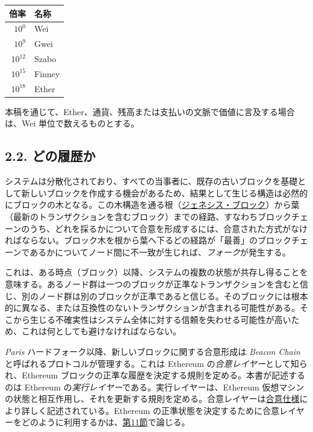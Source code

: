\documentclass[
]{ltjsarticle}
\begin{document}
\begin{longtable}[]{@{}rl@{}}
\toprule\noalign{}
倍率 & 名称 \\
\midrule\noalign{}
\endhead
\bottomrule\noalign{}
\endlastfoot
\(10^0\) & Wei \\
\(10^9\) & Gwei \\
\(10^{12}\) & Szabo \\
\(10^{15}\) & Finney \\
\(10^{18}\) & Ether \\
\end{longtable}

本稿を通じて、Ether、通貨、残高または支払いの文脈で価値に言及する場合は、Wei
単位で数えるものとする。

\hypertarget{ux3069ux306eux5c65ux6b74ux304b}{%
\subsection{2.2. どの履歴か}\label{ux3069ux306eux5c65ux6b74ux304b}}

システムは分散化されており、すべての当事者に、既存の古いブロックを基礎として新しいブロックを作成する機会があるため、結果として生じる構造は必然的にブロックの木となる。この木構造を通る根（\protect\hyperlink{Genesis_Block}{ジェネシス・ブロック}）から葉（最新のトランザクションを含むブロック）までの経路、すなわちブロックチェーンのうち、どれを採るかについて合意を形成するには、合意された方式がなければならない。ブロック木を根から葉へ下るどの経路が「最善」のブロックチェーンであるかについてノード間に不一致が生じれば、\emph{フォーク}が発生する。

これは、ある時点（ブロック）以降、システムの複数の状態が共存し得ることを意味する。あるノード群は一つのブロックが正準なトランザクションを含むと信じ、別のノード群は別のブロックが正準であると信じる。そのブロックには根本的に異なる、または互換性のないトランザクションが含まれる可能性がある。そこから生じる不確実性はシステム全体に対する信頼を失わせる可能性が高いため、これは何としても避けなければならない。

\emph{Paris} ハードフォーク以降、新しいブロックに関する合意形成は
\emph{Beacon Chain} と呼ばれるプロトコルが管理する。これは Ethereum
の\emph{合意レイヤー}として知られ、Ethereum
ブロックの正準な履歴を決定する規則を定める。本書が記述するのは Ethereum
の\emph{実行レイヤー}である。実行レイヤーは、Ethereum
仮想マシンの状態と相互作用し、それを更新する規則を定める。合意レイヤーは\href{https://github.com/ethereum/consensus-specs}{合意仕様}により詳しく記述されている。Ethereum
の正準状態を決定するために合意レイヤーをどのように利用するかは、\protect\hyperlink{ch:blocktree_to_blockchain}{第11節}で論じる。
\end{document}
